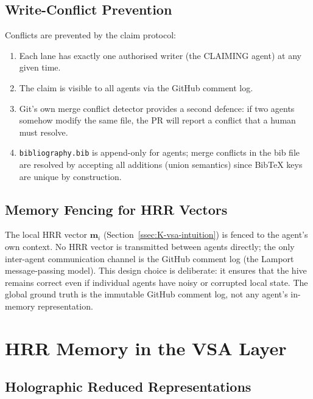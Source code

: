 \subsection{Write-Conflict Prevention}
\label{ssec:K-conflict-prevention}

Conflicts are prevented by the claim protocol:
\begin{enumerate}
  \item Each lane has exactly one authorised writer (the CLAIMING
    agent) at any given time.
  \item The claim is visible to all agents via the GitHub comment log.
  \item Git's own merge conflict detector provides a second defence: if
    two agents somehow modify the same file, the PR will report a
    conflict that a human must resolve.
  \item \texttt{bibliography.bib} is append-only for agents; merge
    conflicts in the bib file are resolved by accepting all additions
    (union semantics) since BibTeX keys are unique by construction.
\end{enumerate}

\subsection{Memory Fencing for HRR Vectors}
\label{ssec:K-memory-fencing}

The local HRR vector $\mathbf{m}_i$ (Section~\ref{ssec:K-vsa-intuition})
is fenced to the agent's own context. No HRR vector is transmitted
between agents directly; the only inter-agent communication channel is
the GitHub comment log (the Lamport message-passing model). This design
choice is deliberate: it ensures that the hive remains correct even if
individual agents have noisy or corrupted local state. The global
ground truth is the immutable GitHub comment log, not any agent's
in-memory representation.


\section{HRR Memory in the VSA Layer}
\label{sec:K-hrr}

\subsection{Holographic Reduced Representations}
\label{ssec:K-hrr-basics}

